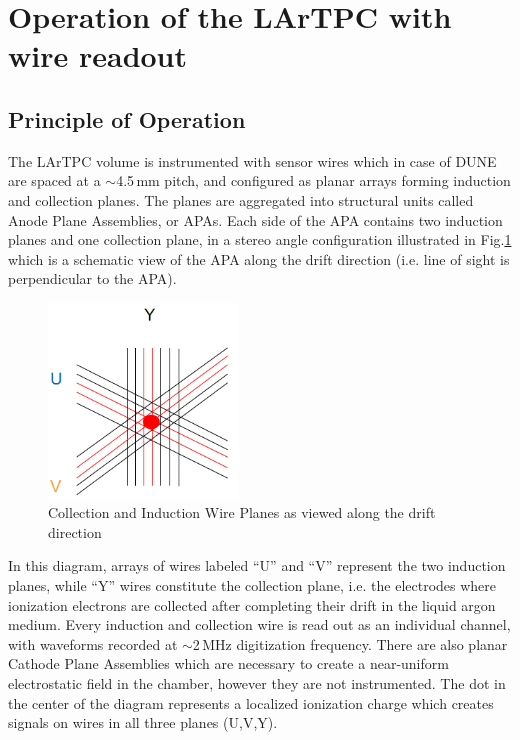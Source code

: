 \documentclass[a4paper]{jpconf}
\begin{document}
\section{Operation of the LArTPC with wire readout}
\subsection{Principle of Operation}
The LArTPC volume is instrumented with sensor wires which in case of DUNE are spaced at a $\sim$4.5\,mm pitch, and configured 
as planar arrays forming induction and collection planes. The planes are aggregated into structural units called Anode Plane Assemblies,
or APAs. Each side of the APA contains two induction planes and one collection plane, in a stereo angle configuration illustrated in
Fig.\ref{fig:wireplanes1} which is a schematic view of the APA along the drift direction (i.e. line of sight is perpendicular to the APA).
\begin{figure}[h!]
	\centering
	\includegraphics[width=0.45\textwidth]{uvy_3.png}
	\caption{Collection and Induction Wire Planes as viewed along the drift direction}
	\label{fig:wireplanes1}
\end{figure}

\noindent
In this diagram, arrays of wires labeled ``U'' and ``V'' represent the two induction planes, while ``Y'' wires constitute the
collection plane, i.e. the electrodes where ionization electrons are collected after completing their drift in the liquid argon medium.
Every induction and collection wire is read out as an individual channel, with waveforms recorded at $\sim$2\,MHz digitization frequency.
There are also planar Cathode Plane Assemblies which are necessary to create a near-uniform electrostatic field in
the chamber, however they are not instrumented. The dot in the center of the diagram represents a localized ionization charge
which creates signals on wires in all three planes (U,V,Y).
\end{document}
